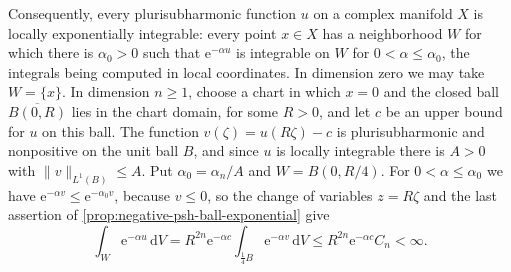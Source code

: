 Consequently, every plurisubharmonic function $u$ on a complex manifold $X$ is locally exponentially integrable: every point $x\in X$ has a neighborhood $W$ for which there is $\alpha_0>0$ such that $\mathrm e^{-\alpha u}$ is integrable on $W$ for $0<\alpha\leq\alpha_0$, the integrals being computed in local coordinates. In dimension zero we may take $W=\{x\}$. In dimension $n\geq1$, choose a chart in which $x=0$ and the closed ball $\overline{B(0,R)}$ lies in the chart domain, for some $R>0$, and let $c$ be an upper bound for $u$ on this ball. The function $v(\zeta)=u(R\zeta)-c$ is plurisubharmonic and nonpositive on the unit ball $B$, and since $u$ is locally integrable there is $A>0$ with $\|v\|_{L^1(B)}\leq A$. Put $\alpha_0=\alpha_n/A$ and $W=B(0,R/4)$. For $0<\alpha\leq\alpha_0$ we have $\mathrm e^{-\alpha v}\leq\mathrm e^{-\alpha_0v}$, because $v\leq0$, so the change of variables $z=R\zeta$ and the last assertion of \cref{prop:negative-psh-ball-exponential} give
\[
 \int_W\mathrm e^{-\alpha u}\,\mathrm dV=R^{2n}\mathrm e^{-\alpha c}\int_{\frac14B}\mathrm e^{-\alpha v}\,\mathrm dV\leq R^{2n}\mathrm e^{-\alpha c}C_n<\infty.
\]
